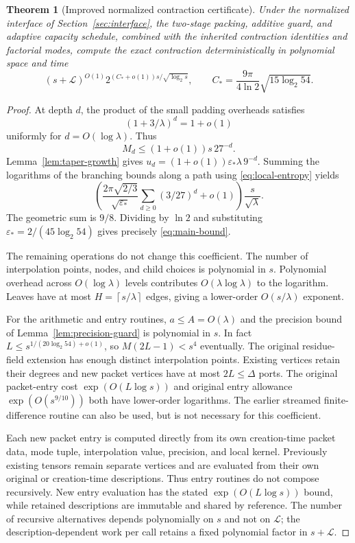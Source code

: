 \documentclass[11pt,letterpaper]{article}
\numberwithin{equation}{section}
\newtheorem{theorem}{Theorem}[section]
\theoremstyle{definition}\newtheorem{definition}[theorem]{Definition}
\theoremstyle{remark}\newtheorem{remark}[theorem]{Remark}
\newcommand{\ceil}[1]{\left\lceil #1\right\rceil}
\newcommand{\Cstar}{C_*}
\newcommand{\desc}{\mathcal L}
\begin{document}
\begin{theorem}[Improved normalized contraction certificate]
\label{thm:main}
Under the normalized interface of Section~\ref{sec:interface}, the two-stage
packing, additive guard, and adaptive capacity schedule, combined with the
inherited contraction identities and factorial modes, compute the exact
contraction deterministically in polynomial space and time
\begin{equation}
 (s+\desc)^{O(1)}
 2^{(\Cstar+o(1))s/\sqrt{\log_2s}},
 \qquad
 \boxed{\Cstar=\frac{9\pi}{4\ln2}\sqrt{15\log_2 54}}.
 \label{eq:main-bound}
\end{equation}
\end{theorem}
\begin{proof}
At depth $d$, the product of the small padding overheads satisfies
\[
 (1+3/\lambda)^d=1+o(1)
\]
uniformly for $d=O(\log\lambda)$. Thus
\[
 M_d\le(1+o(1))s\,27^{-d}.
\]
Lemma~\ref{lem:taper-growth} gives
$u_d=(1+o(1))\varepsilon_*\lambda\,9^{-d}$.
Summing the logarithms of the branching bounds along a path using
\eqref{eq:local-entropy} yields
\[
 \left(\frac{2\pi\sqrt{2/3}}{\sqrt{\varepsilon_*}}
       \sum_{d\ge0}(3/27)^d+o(1)\right)
       \frac{s}{\sqrt\lambda}.
\]
The geometric sum is $9/8$. Dividing by $\ln2$ and substituting
$\varepsilon_*=2/(45\log_2 54)$ gives precisely \eqref{eq:main-bound}.

The remaining operations do not change this coefficient. The number of
interpolation points, nodes, and child choices is polynomial in $s$.
Polynomial overhead across $O(\log\lambda)$ levels contributes
$O(\lambda\log\lambda)$ to the logarithm. Leaves have at most
$H=\ceil{s/\lambda}$ edges, giving a lower-order $O(s/\lambda)$ exponent.

For the arithmetic and entry routines, $a\le A=O(\lambda)$ and the
precision bound of Lemma~\ref{lem:precision-guard} is polynomial in $s$.
In fact $L\le s^{1/(20\log_2 54)+o(1)}$, so
$M(2L-1)<s^4$ eventually. The original residue-field extension has
enough distinct interpolation points. Existing vertices retain their
degrees and new packet vertices have at most $2L\le\Delta$ ports.
The original packet-entry cost $\exp(O(L\log s))$ and original entry
allowance $\exp(O(s^{9/10}))$ both have lower-order logarithms.
The earlier streamed finite-difference routine can also be used, but is
not necessary for this coefficient.

Each new packet entry is computed directly from its own creation-time
packet data, mode tuple, interpolation value, precision, and local kernel.
Previously existing tensors remain separate vertices and are evaluated
from their own original or creation-time descriptions. Thus entry routines
do not compose recursively. New entry evaluation has the stated
$\exp(O(L\log s))$ bound, while retained descriptions are immutable and
shared by reference. The number of recursive alternatives depends
polynomially on $s$ and not on $\desc$; the description-dependent work
per call retains a fixed polynomial factor in $s+\desc$.


\end{proof}
\end{document}
